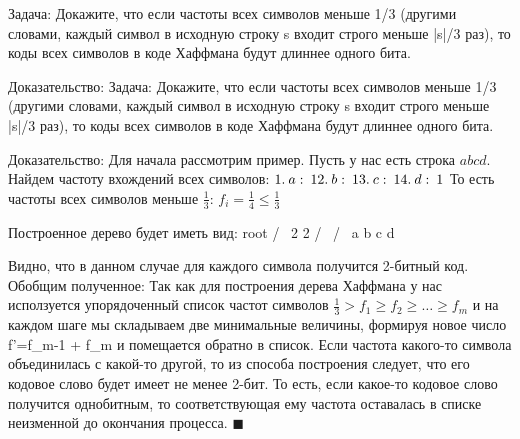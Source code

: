 Задача:
Докажите, что если частоты всех символов меньше 1/3 (другими словами, каждый символ в исходную строку s входит строго
меньше |s|/3 раз), то коды всех символов в коде Хаффмана будут длиннее одного бита.

Доказательство:
Задача:
Докажите, что если частоты всех символов меньше 1/3 (другими словами, каждый символ в исходную строку s входит строго
меньше |s|/3 раз), то коды всех символов в коде Хаффмана будут длиннее одного бита.

Доказательство:
Для начала рассмотрим пример. Пусть у нас есть строка $abcd$. Найдем частоту вхождений всех символов:
$
1. \: a: \: 1 \\
2. \: b: \: 1 \\
3. \: c: \: 1 \\
4. \: d: \: 1
$
То есть частоты всех символов меньше $\frac{1}{3}$:
$f_i = \frac{1}{4} \le \frac{1}{3}$

Построенное дерево будет иметь вид:
       root
    /        \
   2          2
 /   \      /   \
a     b    c     d

Видно, что в данном случае для каждого символа получится 2-битный код.
Обобщим полученное:
Так как для построения дерева Хаффмана у нас исползуется упорядоченный список частот символов
$\frac{1}{3} > f_1 \geq f_2 \geq \ldots \geq f_m$
и на каждом шаге мы складываем две минимальные величины, формируя новое число f'=f_{m-1} + f_m и помещается обратно в
список.
Если частота какого-то символа объединилась с какой-то другой, то из способа построения следует, что его кодовое слово
будет имеет не менее 2-бит. То есть, если какое-то кодовое слово получится однобитным, то соответствующая ему частота
оставалась в списке неизменной до окончания процесса. $\blacksquare$